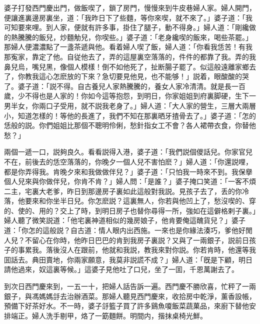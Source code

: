 婆子打發西門慶出門，做飯喫了，鎖了房門，慢慢來到牛皮巷婦人家。婦人開門，便讓進裏邊房裏坐，道：「我昨日下了些麵，等你來喫，就不來了。」婆子道：「我可知要來哩。到人家，便就有許多事，掛住了腿子，動不得身。」婦人道：「剛纔做的熱騰騰的飯兒，炒麵觔兒，你喫些。」婆子道：「老身纔喫的飯來，喝些茶罷。」那婦人便濃濃點了一盞茶遞與他。看着婦人喫了飯，婦人道：「你看我恁苦！有我那寃家，靠定了他。自従他去了，弄的這屋裏空落落的，件件的都靠了我。弄的我鼻兒烏，嘴兒黑，像個人模樣！倒不如他死了，扯断腸子罷了。似這般遠離家鄉去了，你教我這心怎麽放的下來？急切要見他見，也不能够！」説着，眼酸酸的哭了。婆子道：「説不得。自古養兒人家熱騰騰的，養女人家冷清清。就是長一百歲，少不得也是人家的！你如今這等抱怨，到明日，你家姐姐到府裏脚硬，生下一男半女，你兩口子受用，就不説我老身了。」婦人道：「大人家的營生，三層大兩層小，知道怎樣的！等他的長進了，我們不知在那裏晒牙揸骨去了。」婆子道：「怎的恁般的説。你們姐姐比那個不聰明伶俐，愁針指女工不會？各人裙帶衣食，你替他愁？」

兩個一遞一口，説夠良久。看看説得入港，婆子道：「我們説個儍話兒。你家官兒不在，前後去的恁空落落的，你晚夕一個人兒不害怕麽？」婦人道：「你還説哩，都是你弄得我。肯晚夕來和我做做伴兒？」婆子道：「只怕我一時來不到。我保擧個人兒來與你做伴兒，你肯不肯？」婦人問：「是誰？」婆子掩口笑道：「一客不煩二主，宅裏大老爹，昨日到那邊房子裏如此這般對我説。見孩子去了，丢的你冷落，他要來和你坐半日兒。你怎麽説？這裏無人，你若與他凹上了，愁沒喫的、穿的、使的、用的？交上了時，到明日房子也替你尋得一所，強如在這僻格剌子裏。」婦人聽了微笑説道：「他宅裏神道相似的幾房娘子，他肯要俺這醜貨兒？」婆子道：「你怎的這般説？自古道：情人眼内出西施。一來也是你緣法湊巧，爹他好閒人兒？不留心在你時，他昨日巴巴的肯到我房子裏説？又與了一兩銀子，説前日孩子的事累我。落後沒人在跟前，他就和我説，教我來對你説。你若肯時，他還等我囬話去。典田賣地，你兩家願意，我莫非説謊不成？」婦人道：「旣是下顧，明日請他過來，奴這裏等候。」這婆子見他吐了口兒，坐了一囬，千恩萬謝去了。

到次日西門慶來到，一五一十，把婦人話告訴一遍。西門慶不勝欣喜，忙秤了一兩銀子，與馮媽媽㧱去治辦酒菜。那婦人聽見西門慶來，收拾房中乾淨，薰香設帳，預備下好茶好水。不一時，婆子㧱籃子買了許多鷄魚嗄飯菜蔬菓品，來廚下替他安排端正。婦人洗手剔甲，烙了一筯麵餅。明間内，揩抹桌椅光鮮。

